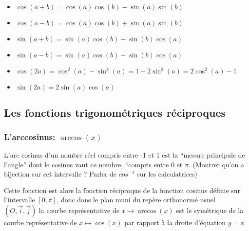 \hspace{-1cm}
\begin{minipage}{0.45\linewidth}
  \begin{itemize}[label=$\bullet$]
  \item $\cos(a+b) = \cos(a) \cos(b) - \sin(a)\sin(b)$
  \item $\cos(a-b) = \cos(a) \cos(b) + \sin(a)\sin(b)$
  \item $\sin(a+b) = \sin(a) \cos(b) + \sin(b)\cos(a)$
  \item $\sin(a-b) = \sin(a) \cos(b) - \sin(b)\cos(a)$  
  \end{itemize}
\end{minipage}
\begin{minipage}{0.7\linewidth}
  \begin{itemize}[label=$\bullet$]
  \item $\cos(2a) = \cos^2(a) - \sin^2(a) = 1 - 2\sin^2(a) = 2\cos^2(a)-1$
  \item $\sin(2a) = 2\sin(a) \cos(a)$
  \end{itemize}
\end{minipage}

\subsection{Les fonctions trigonométriques réciproques}
\subsubsection{L'arccosinus: $\arccos(x)$}

L'arc cosinus d'un nombre réel compris entre -1 et 1 est la ``mesure principale
de l'angle'' dont le cosinus vaut ce nombre, ``compris entre  $0$ et
$\pi$. (Montrer qu'on a bijection sur cet intervalle ? Parler de $cos^{-1}$ sur
les calculatrices)

Cette fonction est alors la fonction réciproque de la fonction cosinus définie
sur l'intervalle $[0,\pi]$, donc dans le plan muni du repère orthonormé usuel
$(O,\vec{i}, \vec
{j})$ la courbe représentative de $x \mapsto \arccos(x)$ est le
symétrique de la courbe représentative de $x \mapsto \cos(x)$ par rapport à
la droite d'équation $y=x$

\begin{center}
\end{center}


